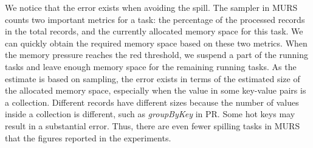 We notice that the error exists when avoiding the spill. The sampler in MURS counts two important metrics for a task: the percentage of the processed records in the total records, and the currently allocated memory space for this task. We can quickly obtain the required memory space based on these two metrics. When the memory pressure reaches the red threshold, we suspend a part of the running tasks and leave enough memory space for the remaining running tasks. As the estimate is based on sampling, the error exists in terms of the estimated size of the allocated memory space, especially when the value in some key-value pairs is a collection. Different records have different sizes because the number of values inside a collection is different, such as \textit{groupByKey} in PR. Some hot keys may result in a substantial error. Thus, there are even fewer spilling tasks in MURS that the figures reported in the experiments.
